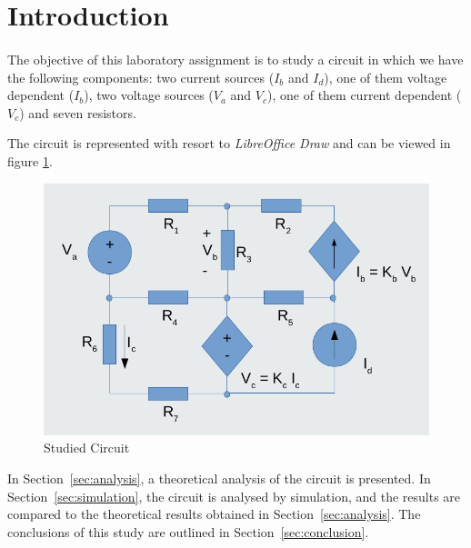 \section{Introduction}
\label{sec:introduction}
\paragraph{}
\par The objective of this laboratory assignment is to study a circuit in which we have the following components: two current sources ($I_b$ and $I_d$), one of them voltage dependent ($I_b$), two voltage sources ($V_a$ and $V_c$), one of them current dependent ($V_c$) and seven resistors. 
\par The circuit is represented with resort to \textit{LibreOffice Draw} and can be viewed in figure \ref{circuit}.

\begin{figure}[H]
    \includegraphics[width=0.8\linewidth]{Circuito.png}
    \centering
    \caption{Studied Circuit}
    \label{circuit}
\end{figure}

In Section~\ref{sec:analysis}, a theoretical analysis of the circuit is
presented. In Section~\ref{sec:simulation}, the circuit is analysed by
simulation, and the results are compared to the theoretical results obtained in
Section~\ref{sec:analysis}. The conclusions of this study are outlined in
Section~\ref{sec:conclusion}.
